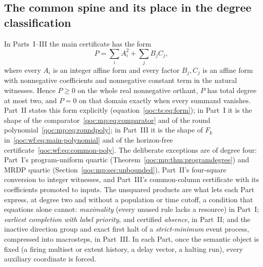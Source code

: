 \documentclass[11pt,letterpaper]{article}
\theoremstyle{definition}
\theoremstyle{remark}
\begin{document}
\subsection{The common spine and its place in the degree classification}\label{qoc:sec:spine}

In Parts~I--III the main certificate has the form
\begin{equation}\label{qoc:eq:spine}
 P=\sum_i A_i^2+\sum_j B_jC_j ,
\end{equation}
where every $A_i$ is an integer affine form and every factor $B_j,C_j$ is an affine form with nonnegative coefficients and nonnegative constant term in the natural witnesses. Hence $P\ge0$ on the whole real nonnegative orthant, $P$ has total degree at most two, and $P=0$ on that domain exactly when every summand vanishes. Part~II states this form explicitly (equation~\eqref{qoc:ts:eq:form}); in Part~I it is the shape of the comparator~\eqref{qoc:mp:eq:comparator} and of the round polynomial~\eqref{qoc:mp:eq:roundpoly}; in Part~III it is the shape of $F_k$ in~\eqref{qoc:wf:eq:main-polynomial} and of the horizon-free certificate~\eqref{qoc:wf:eq:common-poly}. The deliberate exceptions are of degree four: Part~I's program-uniform quartic (Theorem~\ref{qoc:mp:thm:programdegree}) and MRDP quartic (Section~\ref{qoc:mp:sec:unbounded}), Part~II's four-square conversion to integer witnesses, and Part~III's common-column certificate with its coefficients promoted to inputs. The unsquared products are what lets each Part express, at degree two and without a population or time cutoff, a condition that equations alone cannot: \emph{maximality} (every unused rule lacks a resource) in Part~I; \emph{earliest completion with label priority}, and certified \emph{absence}, in Part~II; and the inactive direction group and exact first halt of a \emph{strict-minimum} event process, compressed into macrosteps, in Part~III. In each Part, once the semantic object is fixed (a firing multiset or extent history, a delay vector, a halting run), every auxiliary coordinate is forced.
\end{document}
